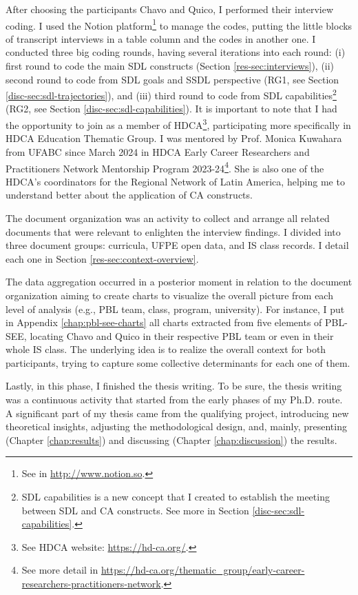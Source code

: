 After choosing the participants Chavo and Quico, I performed their interview coding. I used the Notion platform\footnote{See in \url{http://www.notion.so}.} to manage the codes, putting the little blocks of transcript interviews in a table column and the codes in another one. I conducted three big coding rounds, having several iterations into each round: (i) first round to code the main \gls{SDL} constructs (Section \ref{res-sec:interviews}), (ii) second round to code from \gls{SDL} goals and \gls{SSDL} perspective (\gls{RG}1, see Section \ref{disc-sec:sdl-trajectories}), and (iii) third round to code from \gls{SDL} capabilities\footnote{\gls{SDL} capabilities is a new concept that I created to establish the meeting between \gls{SDL} and \gls{CA} constructs. See more in Section \ref{disc-sec:sdl-capabilities}.} (\gls{RG}2, see Section \ref{disc-sec:sdl-capabilities}). It is important to note that I had the opportunity to join as a member of \gls{HDCA}\footnote{See \gls{HDCA} website: \url{https://hd-ca.org/}.}, participating more specifically in \gls{HDCA} Education Thematic Group. I was mentored by Prof. Monica Kuwahara from \gls{UFABC} since March 2024 in \gls{HDCA} Early Career Researchers and Practitioners Network Mentorship Program 2023-24\footnote{See more detail in \url{https://hd-ca.org/thematic_group/early-career-researchers-practitioners-network}.}. She is also one of the \gls{HDCA}'s coordinators for the Regional Network of Latin America, helping me to understand better about the application of \gls{CA} constructs.

The document organization was an activity to collect and arrange all related documents that were relevant to enlighten the interview findings. I divided into three document groups: curricula, \gls{UFPE} open data, and \gls{IS} class records. I detail each one in Section \ref{res-sec:context-overview}.

The data aggregation occurred in a posterior moment in relation to the document organization aiming to create charts to visualize the overall picture from each level of analysis (e.g., \gls{PBL} team, class, program, university). For instance, I put in Appendix \ref{chap:pbl-see-charts} all charts extracted from five elements of \gls{PBL-SEE}, locating Chavo and Quico in their respective \gls{PBL} team or even in their whole \gls{IS} class. The underlying idea is to realize the overall context for both participants, trying to capture some collective determinants for each one of them.

Lastly, in this phase, I finished the thesis writing. To be sure, the thesis writing was a continuous activity that started from the early phases of my \gls{Ph.D.} route. A significant part of my thesis came from the qualifying project, introducing new theoretical insights, adjusting the methodological design, and, mainly, presenting (Chapter \ref{chap:results}) and discussing (Chapter \ref{chap:discussion}) the results.

